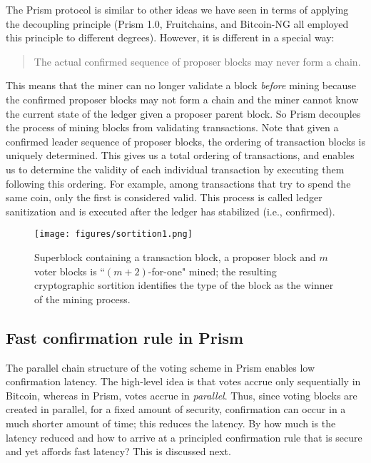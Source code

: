 \documentclass{article}
\begin{document}
The {\sf Prism} protocol is similar to other ideas we have seen in terms of applying the decoupling principle ({\sf Prism 1.0}, {\sf Fruitchains}, and {\sf Bitcoin-NG} all employed this principle to different degrees). However, it is different in a special way: 
\begin{quote}
The actual confirmed sequence of proposer blocks may never form a chain.
\end{quote}
This means  that the miner can no longer validate a block {\em before} mining because the confirmed proposer blocks may not form a chain and the miner cannot know the current state of the ledger given a proposer parent block. So {\sf Prism} decouples the process of mining blocks from validating transactions. Note that given a confirmed leader sequence of proposer blocks, the ordering of transaction blocks is uniquely determined. This gives us a total ordering of transactions, and enables us to determine the validity of each individual transaction by executing them following this ordering. For example, among transactions that try to spend the same coin, only the first is considered valid. This process is called ledger sanitization and is executed after the ledger has stabilized (i.e., confirmed). %

\begin{figure}
    \centering
    \texttt{[image: figures/sortition1.png]}
    \caption{Superblock containing a transaction block, a proposer block and $m$ voter blocks is ``$(m+2)$-for-one" mined; the resulting  cryptographic sortition identifies the type of the block as the winner of the mining process.}
    \label{fig:sortition}
\end{figure}

\subsection*{Fast confirmation rule in Prism}

The parallel chain structure of the voting scheme in {\sf Prism} enables low confirmation latency. The high-level idea is that votes accrue only sequentially in Bitcoin, whereas in {\sf Prism}, votes accrue in {\em parallel}. Thus, since voting blocks are created in parallel, for a fixed amount of security, confirmation can occur in  a much shorter amount of time;   this  reduces the  latency. By how much is the latency reduced and how to arrive at a principled confirmation rule that is secure and yet affords fast latency? This is discussed next. 
\end{document}
